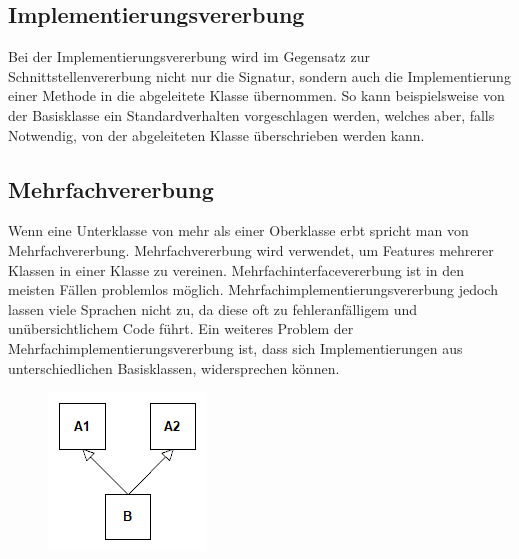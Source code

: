 	\subsection{Implementierungsvererbung}
		Bei der Implementierungsvererbung wird im Gegensatz zur Schnittstellenvererbung nicht nur die Signatur, sondern auch
		die Implementierung einer Methode in die abgeleitete Klasse übernommen. So kann beispielsweise von der Basisklasse ein
		Standardverhalten vorgeschlagen werden, welches aber, falls Notwendig, von der abgeleiteten Klasse überschrieben werden
		kann.
		
	\subsection{Mehrfachvererbung}
		Wenn eine Unterklasse von mehr als einer Oberklasse erbt spricht man von Mehrfachvererbung. Mehrfachvererbung wird
		verwendet, um Features mehrerer Klassen in einer Klasse zu vereinen. Mehrfachinterfacevererbung ist in den meisten
		Fällen problemlos möglich. Mehrfachimplementierungsvererbung jedoch lassen viele Sprachen nicht zu, da diese oft zu 
		fehleranfälligem und unübersichtlichem Code führt. Ein weiteres Problem der Mehrfachimplementierungsvererbung ist, dass
		sich Implementierungen aus unterschiedlichen Basisklassen, widersprechen können.
		\begin{figure}[H]
			\includegraphics[scale=0.75]{vererbung/mehrfach/mehrfach.png}
		\end{figure}
		
